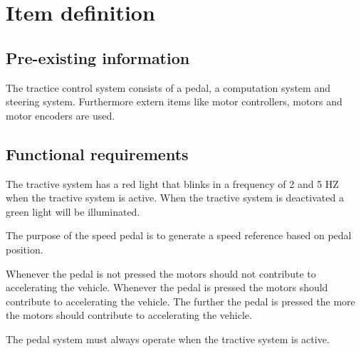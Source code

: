 \section{Item definition}

\subsection{Pre-existing information}
The tractice control system consists of a pedal, a computation system and steering system.
Furthermore extern items like motor controllers, motors and motor encoders are used.

\subsection{Functional requirements}
%
%
The tractive system has a red light that blinks in a frequency of 2 and 5 HZ when the tractive system is active.
When the tractive system is deactivated a green light will be illuminated.

The purpose of the speed pedal is to generate a speed reference based on pedal position.

Whenever the pedal is not pressed the motors should not contribute to accelerating the vehicle.
Whenever the pedal is pressed the motors should contribute to accelerating the vehicle.
The further the pedal is pressed the more the motors should contribute to accelerating the vehicle.

The pedal system must always operate when the tractive system is active.

